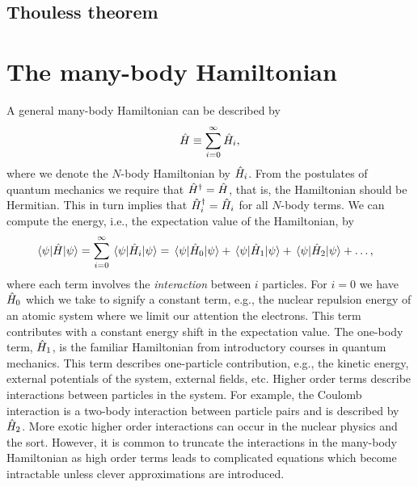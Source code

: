         \subsection{Thouless theorem}



    \section{The many-body Hamiltonian}
        A general many-body Hamiltonian can be described by
        \begin{align}
            \hat{H} \equiv \sum_{i = 0}^{\infty} \hat{H}_i,
        \end{align}
        where we denote the $N$-body Hamiltonian by $\hat{H}_i$.
        From the postulates of quantum mechanics we require that
        $\hat{H}^{\dagger} = \hat{H}$, that is, the Hamiltonian should be
        Hermitian.
        This in turn implies that $\hat{H}_i^{\dagger} = \hat{H}_i$ for all
        $N$-body terms.
        We can compute the energy, i.e., the expectation value of the
        Hamiltonian, by
        \begin{align}
            \mel{\psi}{\hat{H}}{\psi}
            &= \sum_{i = 0}^{\infty} \mel{\psi}{\hat{H}_i}{\psi}
            = \mel{\psi}{\hat{H}_0}{\psi}
            + \mel{\psi}{\hat{H}_1}{\psi}
            + \mel{\psi}{\hat{H}_2}{\psi}
            + \dots,
        \end{align}
        where each term involves the \emph{interaction} between $i$ particles.
        For $i = 0$ we have $\hat{H}_0$ which we take to signify a constant term,
        e.g., the nuclear repulsion energy of an atomic system where we limit
        our attention the electrons.
        This term contributes with a constant energy shift in the expectation
        value.
        The one-body term, $\hat{H}_1$, is the familiar Hamiltonian from
        introductory courses in quantum mechanics.
        This term describes one-particle contribution, e.g., the kinetic
        energy, external potentials of the system, external fields, etc.
        Higher order terms describe interactions between particles in the
        system.
        For example, the Coulomb interaction is a two-body interaction between
        particle pairs and is described by $\hat{H}_2$.
        More exotic higher order interactions can occur in the nuclear physics
        and the sort.
        However, it is common to truncate the interactions in the many-body
        Hamiltonian as high order terms leads to complicated equations which
        become intractable unless clever approximations are introduced.

